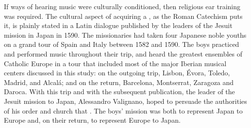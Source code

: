 If ways of hearing music were culturally conditioned, then religious ear 
training was required.
The cultural aspect of acquiring a , as the 
Roman Catechism puts it, is plainly stated in a Latin dialogue published by the 
leaders of the Jesuit mission in Japan in 1590.%
    \Autocite{Sande:DeMissioneLegatorum}
The missionaries had taken four Japanese noble youths on a grand tour of Spain 
and Italy between 1582 and 1590.
The boys practiced and performed music throughout their trip, and heard the 
greatest ensembles of Catholic Europe in a tour that included most of the major 
Iberian musical centers discussed in this study: on the outgoing trip, Lisbon, 
Évora, Toledo, Madrid, and Alcalá; and on the return, Barcelona, Montserrat, 
Zaragoza and Daroca.
With this trip and with the subsequent publication, the leader of the Jesuit 
mission to Japan, Alessandro Valignano, hoped to persuade the authorities of 
his order and church that .%
    \Autocite[4]{Massarella:JapaneseTravellers}
The boys' mission was both to represent Japan to Europe and, on their return, 
to represent Europe to Japan.

